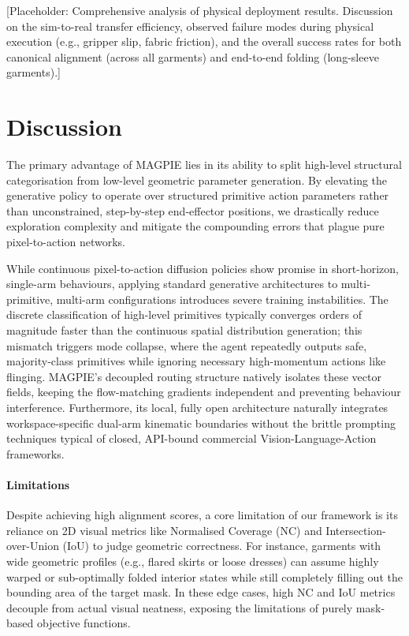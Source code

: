 \documentclass[journal]{IEEEtran}
\begin{document}
[Placeholder: Comprehensive analysis of physical deployment results. Discussion on the sim-to-real transfer efficiency, observed failure modes during physical execution (e.g., gripper slip, fabric friction), and the overall success rates for both canonical alignment (across all garments) and end-to-end folding (long-sleeve garments).]

\section{Discussion}
\label{sec:discussion}

The primary advantage of MAGPIE lies in its ability to split high-level structural categorisation from low-level geometric parameter generation. By elevating the generative policy to operate over structured primitive action parameters rather than unconstrained, step-by-step end-effector positions, we drastically reduce exploration complexity and mitigate the compounding errors that plague pure pixel-to-action networks.

While continuous pixel-to-action diffusion policies \cite{chi2025diffusion} show promise in short-horizon, single-arm behaviours, applying standard generative architectures to multi-primitive, multi-arm configurations introduces severe training instabilities. The discrete classification of high-level primitives typically converges orders of magnitude faster than the continuous spatial distribution generation; this mismatch triggers mode collapse, where the agent repeatedly outputs safe, majority-class primitives while ignoring necessary high-momentum actions like flinging. MAGPIE's decoupled routing structure natively isolates these vector fields, keeping the flow-matching gradients independent and preventing behaviour interference. Furthermore, its local, fully open architecture naturally integrates workspace-specific dual-arm kinematic boundaries without the brittle prompting techniques typical of closed, API-bound commercial Vision-Language-Action frameworks.

\paragraph{Limitations}
Despite achieving high alignment scores, a core limitation of our framework is its reliance on 2D visual metrics like Normalised Coverage (NC) and Intersection-over-Union (IoU) to judge geometric correctness. For instance, garments with wide geometric profiles (e.g., flared skirts or loose dresses) can assume highly warped or sub-optimally folded interior states while still completely filling out the bounding area of the target mask. In these edge cases, high NC and IoU metrics decouple from actual visual neatness, exposing the limitations of purely mask-based objective functions.
\end{document}
